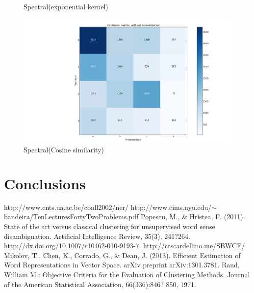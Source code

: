 \documentclass[]{article}
\begin{document}
\begin{figure}
\begin{minipage}[b]{0.5\linewidth}
    \caption{Spectral(exponential kernel)} 
    \vspace{4ex}
  \end{minipage}%
  \begin{minipage}[b]{0.5\linewidth}
    \centering
    \includegraphics[width=1\linewidth]{Figures_Mik/cosSimConfMat2.png} 
    \caption{Spectral(Cosine similarity)} 
    \vspace{4ex}
  \end{minipage} 
\end{figure}


\section{Conclusions}
  
\pagestyle{myheadings}
\thispagestyle{plain}


\begin{thebibliography}{1}
   http://www.cnts.ua.ac.be/conll2002/ner/
  http://www.cims.nyu.edu/$\sim$bandeira/TenLecturesFortyTwoProblems.pdf
   Popescu, M., \& Hristea, F. (2011). State of the art versus classical clustering for unsupervised word sense disambiguation. Artificial Intelligence Review, 35(3), 241?264. http://dx.doi.org/10.1007/s10462-010-9193-7.  
   http://crscardellino.me/SBWCE/
    Mikolov, T., Chen, K., Corrado, G., \& Dean, J. (2013). Efficient Estimation of Word Representations in Vector Space. arXiv preprint arXiv:1301.3781. 
   Rand, William M.: Objective Criteria for the Evaluation of Clustering Methods. Journal of the American Statistical Association, 66(336):846? 850, 1971.
\end{thebibliography} 
\end{document}
